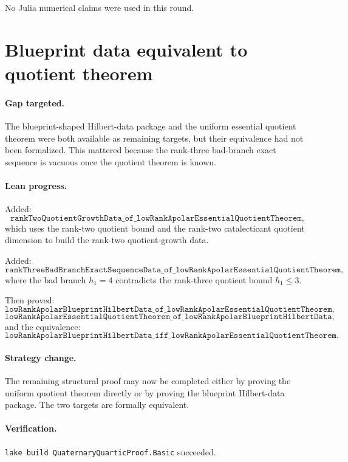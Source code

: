 \documentclass[11pt]{article}
\begin{document}
No Julia numerical claims were used in this round.

\section*{Blueprint data equivalent to quotient theorem}

\paragraph{Gap targeted.}
The blueprint-shaped Hilbert-data package and the uniform essential quotient
theorem were both available as remaining targets, but their equivalence had not
been formalized.  This mattered because the rank-three bad-branch exact
sequence is vacuous once the quotient theorem is known.

\paragraph{Lean progress.}
Added:
\[
\texttt{rankTwoQuotientGrowthData\_of\_lowRankApolarEssentialQuotientTheorem},
\]
which uses the rank-two quotient bound and the rank-two catalecticant quotient
dimension to build the rank-two quotient-growth data.

Added:
\[
\texttt{rankThreeBadBranchExactSequenceData\_of\_lowRankApolarEssentialQuotientTheorem},
\]
where the bad branch \(h_1=4\) contradicts the rank-three quotient bound
\(h_1\le3\).

Then proved:
\[
\texttt{lowRankApolarBlueprintHilbertData\_of\_lowRankApolarEssentialQuotientTheorem},
\]
\[
\texttt{lowRankApolarEssentialQuotientTheorem\_of\_lowRankApolarBlueprintHilbertData},
\]
and the equivalence:
\[
\texttt{lowRankApolarBlueprintHilbertData\_iff\_lowRankApolarEssentialQuotientTheorem}.
\]

\paragraph{Strategy change.}
The remaining structural proof may now be completed either by proving the
uniform quotient theorem directly or by proving the blueprint Hilbert-data
package.  The two targets are formally equivalent.

\paragraph{Verification.}
\texttt{lake build QuaternaryQuarticProof.Basic} succeeded.
\end{document}

